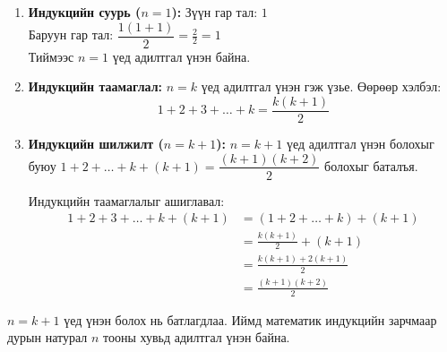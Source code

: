 \begin{enumerate}
\begin{example}
\begin{prof}
\begin{enumerate}
    \item \textbf{Индукцийн суурь ($n=1$):} 
    Зүүн гар тал: $1$ \\
    Баруун гар тал: $\dfrac{1(1+1)}{2} = \frac{2}{2} = 1$ \\
    Тиймээс $n=1$ үед адилтгал үнэн байна.

    \item \textbf{Индукцийн таамаглал:} 
    $n=k$ үед адилтгал үнэн гэж үзье. Өөрөөр хэлбэл:
    \begin{equation}
    1 + 2 + 3 + \dots + k = \frac{k(k+1)}{2}
    \end{equation}

    \item \textbf{Индукцийн шилжилт ($n=k+1$):} 
    $n=k+1$ үед адилтгал үнэн болохыг буюу 
    $1 + 2 + \dots + k + (k+1) = \dfrac{(k+1)(k+2)}{2}$ болохыг баталъя.
    
    Индукцийн таамаглалыг ашиглавал:
    \begin{align*}
    1 + 2 + 3 + \dots + k + (k+1) &= (1 + 2 + \dots + k) + (k+1) \\
    &= \frac{k(k+1)}{2} + (k+1) \\
    &= \frac{k(k+1) + 2(k+1)}{2} \\
    &= \frac{(k+1)(k+2)}{2}
    \end{align*}
\end{enumerate}

$n=k+1$ үед үнэн болох нь батлагдлаа. Иймд математик индукцийн зарчмаар дурын натурал $n$ тооны хувьд адилтгал үнэн байна.
\end{prof}
\end{example}
\end{enumerate}
\newpage
